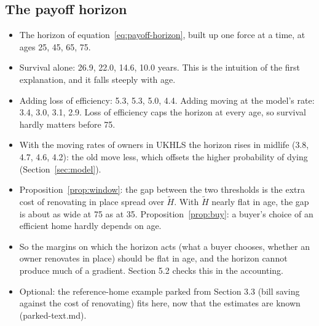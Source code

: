 \subsection{The payoff horizon}

\begin{itemize}
  \item The horizon of equation~\eqref{eq:payoff-horizon}, built up one
    force at a time, at ages 25, 45, 65, 75.
  \item Survival alone: 26.9, 22.0, 14.6, 10.0 years. This is the intuition
    of the first explanation, and it falls steeply with age.
  \item Adding loss of efficiency: 5.3, 5.3, 5.0, 4.4. Adding moving at the
    model's rate: 3.4, 3.0, 3.1, 2.9. Loss of efficiency caps the horizon at
    every age, so survival hardly matters before 75.
  \item With the moving rates of owners in UKHLS the horizon rises in
    midlife (3.8, 4.7, 4.6, 4.2): the old move less, which offsets the
    higher probability of dying (Section~\ref{sec:model}).
\end{itemize}

\begin{itemize}
  \item Proposition~\ref{prop:window}: the gap between the two thresholds is
    the extra cost of renovating in place spread over $\widetilde H$. With
    $\widetilde H$ nearly flat in age, the gap is about as wide at 75 as at
    35. Proposition~\ref{prop:buy}: a buyer's choice of an efficient home
    hardly depends on age.
  \item So the margins on which the horizon acts (what a buyer chooses,
    whether an owner renovates in place) should be flat in age, and the
    horizon cannot produce much of a gradient. Section 5.2 checks this in
    the accounting.
  \item Optional: the reference-home example parked from Section 3.3 (bill
    saving against the cost of renovating) fits here, now that the
    estimates are known (parked-text.md).
\end{itemize}

